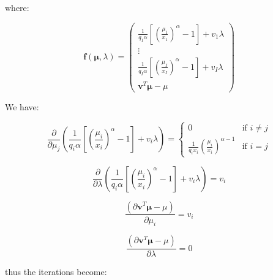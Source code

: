 \documentclass{tex/note}
\begin{document}
where:

\begin{equation*}
\bm{f} \left( \bm{\mu} , \lambda \right) = \begin{pmatrix} \frac{1}{q_1 \alpha} \left[ \left( \frac{\mu_1}{x_1} \right) ^{\alpha} - 1\right] + v_1 \lambda \\ \vdots \\ \frac{1}{q_I \alpha} \left[ \left( \frac{\mu_I}{x_I} \right) ^{\alpha} - 1\right] + v_I \lambda \\ \bm{v}^T \bm{\mu} - \mu \end{pmatrix}
\end{equation*}

We have:

\begin{equation*}
\frac{\partial}{\partial \mu_j} \left( \frac{1}{q_i \alpha} \left[ \left( \frac{\mu_i}{x_i} \right) ^{\alpha} - 1\right] + v_i \lambda \right) =
\begin{cases}
0 & \text{if } i \neq j \\
\frac{1}{q_i x_i} \left( \frac{\mu_i}{x_i} \right)^{\alpha - 1} & \text{if } i = j
\end{cases}
\end{equation*}

\begin{equation*}
\frac{\partial}{\partial \lambda} \left( \frac{1}{q_i \alpha} \left[ \left( \frac{\mu_i}{x_i} \right) ^{\alpha} - 1\right] + v_i \lambda \right) = v_i
\end{equation*}

\begin{equation*}
\frac{\left( \partial \bm{v}^T \bm{\mu} - \mu \right)}{\partial \mu_i} = v_i
\end{equation*}

\begin{equation*}
\frac{\left( \partial \bm{v}^T \bm{\mu} - \mu \right)}{\partial \lambda} = 0
\end{equation*}

thus the iterations become:
\end{document}
